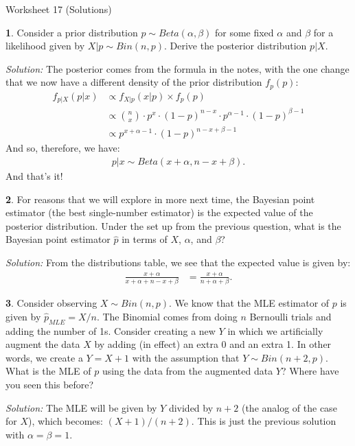 \documentclass{tufte-handout}
\begin{document}
\justify

{\LARGE Worksheet 17 (Solutions)}

\vspace*{18pt}


\textbf{1}. Consider a prior distribution $p \sim Beta(\alpha, \beta)$ for some fixed
$\alpha$ and $\beta$ for a likelihood given by $X|p \sim Bin(n, p)$. Derive
the posterior distribution $p|X$.

\textit{Solution:} The posterior comes from the formula in the notes, with the one change that
we now have a different density of the prior distribution $f_{p}(p)$:
\begin{align*}
f_{p|X}(p|x) &\propto f_{X|p}(x|p) \times f_{p}(p) \\
&\propto \binom{n}{x} \cdot p^{x} \cdot (1 - p)^{n-x} \cdot p^{\alpha - 1} \cdot (1 - p)^{\beta - 1} \\
&\propto p^{x + \alpha - 1} \cdot (1 - p)^{n - x + \beta - 1}
\end{align*}
And so, therefore, we have:
\begin{align*}
p|x \sim Beta(x + \alpha, n - x + \beta).
\end{align*}
And that's it!

\textbf{2}. For reasons that we will explore in more next time, the Bayesian point estimator
(the best single-number estimator) is the expected value of the posterior
distribution. Under the set up from the previous question, what is the Bayesian
point estimator $\widehat{p}$ in terms of $X$, $\alpha$, and $\beta$?

\textit{Solution:} From the distributions table, we see that the expected value is given by:
\begin{align*}
\frac{x + \alpha}{x + \alpha + n - x + \beta} &= \frac{x + \alpha}{n + \alpha + \beta}.
\end{align*}

\textbf{3}. Consider observing $X \sim Bin(n, p)$. We know that the MLE estimator of $p$ is
given by $\hat{p}_{MLE} = X / n$. The Binomial comes from doing $n$ Bernoulli
trials and adding the number of 1s. Consider creating a new $Y$ in which we 
artificially augment the data $X$ by adding (in effect) an extra 0 and an extra
1. In other words, we create a $Y = X + 1$ with the assumption that
$Y \sim Bin(n+2, p)$. What is the MLE of $p$ using the data from the augmented
data $Y$? Where have you seen this before?

\textit{Solution:} The MLE will be given by $Y$ divided by $n+2$ (the analog of the case for $X$),
which becomes: $(X+1)/(n+2)$. This is just the previous solution with
$\alpha = \beta = 1$.
\end{document}
